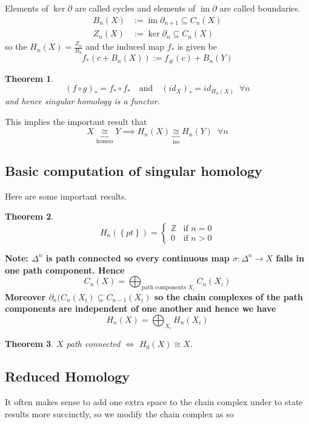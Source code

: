 \documentclass[11pt]{article}
\newcommand{\defeq}{:=}
\DeclareMathOperator{\im}{\mathrm{im}}
\newcommand{\Z}{\mathbb{Z}}
\newenvironment{defin}
	{\begin{mdframed}[backgroundcolor=white, roundcorner=5pt, linewidth=1pt]}
	{\end{mdframed}}
\newcommand{\mdf}[1]{{\color{red} #1}}
\newenvironment{note}
	{\begin{mdframed}[backgroundcolor=white, linecolor=red, roundcorner=5pt, linewidth=1pt]\bfseries{Note:}\normalfont}
	{\end{mdframed}}
\newtheorem{theorem}{Theorem}[section]
\begin{document}
\begin{defin}
	Elements of $\ker\partial$ are called \mdf{cycles} and elements of $\im\partial$ are called \mdf{boundaries}.	
	\begin{align*}
		B_n(X)&\defeq\im\partial_{n+1}\subseteq C_n(X) \\
		Z_n(X)&\defeq\ker\partial_n\subseteq C_n(X)
	\end{align*}
	so the $H_n(X)=\frac{Z_n}{B_n}$ and the induced map $f_\ast$ is given be
	\[
		f_\ast(c+B_n(X))\defeq f_\#(c) + B_n(Y)
	\]
\end{defin}

\begin{theorem}
\[
	(f\circ g)_\ast = f_\ast \circ f_\ast \quad \text{and} \quad \left(id_X\right)_\ast = id_{H_n(X)} \;\; \forall n
\]
and hence singular homology is a functor.
\end{theorem}

This implies the important result that
\[
	X\underbrace{\cong}_{\text{homeo}}Y \implies H_n(X) \underbrace{\cong}_{\text{iso}} H_n(Y) \;\; \forall n
\]

\subsection{Basic computation of singular homology}
Here are some important results.
\begin{theorem}
\[
	H_n(\left\{pt\right\})=
	\begin{cases}
		\Z & \text{if }n=0 \\
		0  & \text{if }n>0
	\end{cases}
\]
\end{theorem}

\begin{note}
$\Delta^n$ is path connected so every continuous map $\sigma:\Delta^n\to X$ falls in one path component.
Hence
\[
	C_n(X)=\bigoplus_{\text{path components }X_i} C_n(X_i)
\]
Moreover $\partial_n (C_n(X_i)\subseteq C_{n-1}(X_i)$ so the chain complexes of the path components are independent of one another and hence we have
\[
	H_n(X)=\bigoplus_{X_i} H_n(X_i)
\]
\end{note}

\begin{theorem}
$X$ path connected $\iff$ $H_0(X)\cong X$.
\end{theorem}

\subsection{Reduced Homology}
It often makes sense to add one extra space to the chain complex under to state results more succinctly, so we modify the chain complex as so
\end{document}
